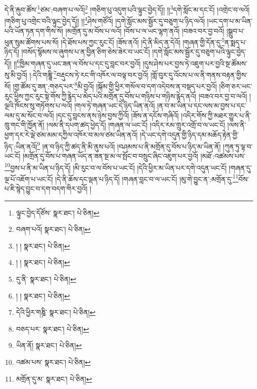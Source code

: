 དེ་ནི་རྐུབ་ཚོས་\footnote{ལྟུང་བྱེད་དོཙོས་  སྣར་ཐང་།  པེ་ཅིན། }ཙམ་:བཞག་པ་ལའོ།\footnote{བཞག་པའོ།  སྣར་ཐང་།  པེ་ཅིན། } །གཅིག་པུ་འདུག་པའི་ལྟུང་བྱེད་དོ།། །།\footnote{། །  སྣར་ཐང་།  པེ་ཅིན། }དགེ་སློང་མ་དང་ངོ། །འགྲེང་བ་ལའོ། །གཅིག་པུ་འགྲེང་བའི་ལྟུང་བྱེད་དོ།། །།\footnote{། །  སྣར་ཐང་།  པེ་ཅིན། }ཤེས་གཙོའོ། །དགེ་སློང་མས་སྦྱོར་དུ་བཅུག་པ་ཉིད་ལའོ། །ཡང་དག་པ་མ་ཡིན་པའི་ཡོན་ཏན་དག་གིས་སོ། །མགྲོན་དུ་མ་བོས་པ་ལའོ། །བོས་པ་ལ་ཡང་ལྷག་ནའོ། །བཟའ་བར་བྱ་བའོ། །སྒྲུབ་པ་ཕུན་སུམ་ཚོགས་པས་སོ། །དེ་ཐོས་པས་ཀྱང་རུང་ངོ། །ཟོས་ནའོ། །དེ་ནི་མིད་ན་དེའོ། །གཞན་གྱི་དོན་དུ་\footnote{དུ་ནི་  སྣར་ཐང་།  པེ་ཅིན། }ན་སྨད་པ་ཉིད་དོ། །བསོད་སྙོམས་ལ་ཞུགས་པ་ན་བྱིན་ཅིག་ཅེས་ཟེར་བ་ཡང་ངོ། །དགེ་སློང་མས་སྦྱོར་དུ་བཅུག་པའི་ལྟུང་བྱེད་དོ།། །།\footnote{། །  སྣར་ཐང་།  པེ་ཅིན། }ཁྱིམ་གཞན་དུ་ཡང་ཟན་ལ་བོས་པ་དང་དུ་བླང་བར་བྱའོ། །དུས་ཤེས་པར་བྱས་ཏེ་འཇུག་པར་བྱའི་སྔ་ཚོམས་སུ་མི་བྱའོ། །:དེའི་གཎྜཱི་\footnote{དེའི་ཕྱིར་གཎྜི་  སྣར་ཐང་།  པེ་ཅིན། }བརྡུངས་ཏེ་རང་གི་འཁོར་ལ་བལྟ་བར་བྱའོ། །གློ་བུར་དུ་འོངས་པ་ལ་ནི་གནས་བརྟན་གྱིས་སོ། །གྱ་ཚོམ་དུ་ཟན་:གཅད་པར་\footnote{བཅད་པར་  སྣར་ཐང་།  པེ་ཅིན། }མི་བྱའོ། །སྐོམ་གྱི་ཕྱིར་གསོལ་བ་དག་འདེབས་ན་བསྡད་པར་བྱའོ། །ཅིག་ཅར་ཡང་རུང་ཕྱིས་ཀྱང་རུང་སྟེ་གོས་ཀྱི་རྙེད་པ་མེད་པའི་མགྲོན་དུ་བོས་པ་གཉིས་པ་གཉིས་རྙེད་ནའོ། །བཟའ་བར་བྱ་བ་ལའོ། །ལྔའི་ཁོངས་སུ་གཏོགས་པ་ལའོ། །གལ་ཏེ་གཞན་ཡང་དེ་ཉིད་ཡིན་ནའོ། །ན་བ་མ་ཡིན་པ་དང་ལས་མ་བྱས་པ་དང་ལམ་དུ་མ་སོང་བ་ལའོ། །དང་དུ་བླངས་ནས་ཉེས་བྱས་ཀྱིའོ། །ཟོས་ན་དངོས་གཞིའོ། །འདིར་གོས་ཀྱི་མཐར་གྱུར་པ་ནི་ཁྲུ་གང་གི་ཁྱོན་ནོ། །ལམ་ནི་དཔག་ཚད་ཕྱེད་དོ། །གཞན་ལ་ཡང་ངོ། །འདིར་རམ་གྲུར་འགྲོ་བ་ལ་ཡང་ངོ། །ལས་ནི་ཕྱག་དར་རེ་ལྡེ་ཙམ་མམ་དཀྱིལ་འཁོར་བ་མལ་ཙམ་ཡིན་ནའོ། །དེ་ཡང་དགེ་འདུན་གྱི་ཉིད་དམ་མཆོད་རྟེན་གྱི་ཉིད་:ཡིན་ནའོ།\footnote{ཡིན་ནོ།  སྣར་ཐང་།  པེ་ཅིན། } །ན་བ་ཉིད་ཀྱི་ཚད་ནི་མི་ནུས་པའོ། །བཤམས་པ་ནི་མགྲོན་དུ་བོས་པ་ཉིད་མ་ཡིན་ནོ། །ཀུན་ཏུ་ལྟ་བ་ཡང་ངོ། །མགྲོན་དུ་བོས་པ་གཞན་ཡོད་ན་ཟན་སྔ་མ་ལ་སྤོང་བ་བསྲུང་ཞིང་འཇུག་པར་བྱའོ། །མཐོ་:འཚམས་པས་\footnote{འཚམ་པས་  སྣར་ཐང་།  པེ་ཅིན། }བྱས་པ་ནི་མ་ཡིན་པ་ཉིད་དོ། །མི་རུང་བ་ལ་བོས་པ་ཡང་ངོ། །དེའི་ཕྱིར་མ་ཡིན་པར་དགེ་འདུན་ཡང་ངོ། །གཞན་དུ་ལྔ་པོ་འཇོག་པ་ཡང་ངོ། །དེ་ནི་ཆོས་དང་ལྡན་པ་ཉིད་དོ། །གཞན་བླང་བ་ལ་ཡང་ངོ། །མུ་གེ་བྱུང་ན་:མགྲོན་དུ་\footnote{མགྲོན་དུ་མ་  སྣར་ཐང་།  པེ་ཅིན། }བོས་པ་ཇི་སྙེད་བྱུང་བ་དག་བདག་གིར་བྱའོ། །
